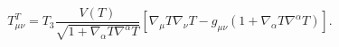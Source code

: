 \begin{equation}\label{tmnt}
T^{T}_{\mu\nu}=
T_3 \frac{V(T)}{\sqrt{1+\nabla_\alpha T\nabla^\alpha T}}\left[
\nabla_\mu T\nabla_\nu T
-g_{\mu\nu}(1+\nabla_\alpha T\nabla^\alpha T) \right].
\end{equation}

